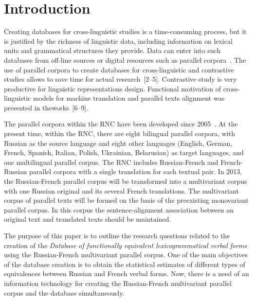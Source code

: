 
      \thispagestyle{headings}

      \begin{multicols}{2}

            \label{st\stat}


\section{Introduction}

  \noindent
   Creating databases for cross-linguistic studies is a time-consuming process, but it is justified by 
the richness of linguistic data, including information on lexical units and grammatical structures 
they provide. Data can enter into such databases from off-line sources or digital resources such as 
parallel corpora~\cite{1-zat}. The use of parallel corpora to create databases for cross-linguistic and 
contrastive studies allows to save time for actual research~[2--5]. Contrastive study is very 
productive for linguistic representations design. Functional motivation of cross-linguistic models 
for machine translation and parallel texts alignment was presented in the\linebreak works~[6--9].
   
   The parallel corpora within the RNC have been developed since 
2005~\cite{2-zat, 3-zat}. At the present time, within the RNC, there are eight bilingual parallel 
corpora, with Russian as the source language and eight other languages (English, German, French, 
Spanish, Italian, Polish, Ukrainian, Belarusian) as target languages, and one multilingual parallel 
corpus. The RNC includes Russian-French and French-Russian parallel corpora with a single 
translation for each textual pair. In 2013, the Russian-French parallel corpus will be transformed 
into a multivariant corpus with one Russian original and its several French translations. 
The multivariant corpus of parallel texts will be formed on the basis of the preexisting monovariant 
parallel corpus. In this corpus the sentence-alignment association between an original text and 
translated texts should be maintained.
   
   The purpose of this paper is to outline the research questions related to the creation of the 
\textit{Database of functionally equivalent lexicogrammatical verbal forms} using the 
   Russian-French multivariant parallel corpus. One of the main objectives of the database creation 
is to obtain the statistical estimates of different types of equivalences between Russian and French 
verbal forms. Now, there is a need of an information technology for creating the Russian-French 
multivariant parallel corpus and the database simultaneously.
   

\end{multicols}
